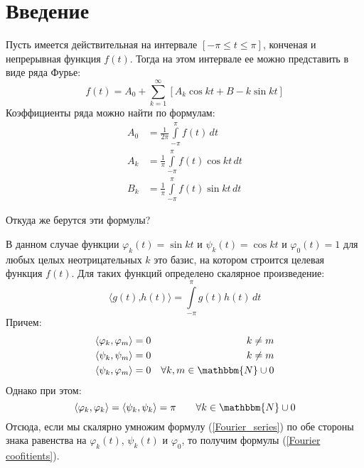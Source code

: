 \section{Введение}
Пусть имеется действительная на интервале $\left[-\pi \leqslant t \leqslant \pi \right]$, конченая и непрерывная функция $f(t)$. Тогда на этом интервале ее можно представить в виде ряда Фурье:
\begin{equation}
    f(t) = A_0 + \sum \limits_{k = 1}^{\infty}\left[A_k \cos{kt} + B-k \sin{kt} \right]
    \label{Fourier_series}
\end{equation}
Коэффициенты ряда можно найти по формулам:
\begin{align}
    A_0 & {} = \frac1{2\pi}\int \limits^{\pi}_{-\pi}f(t)\,dt \\
    A_k & {} = \frac1{\pi} \int \limits^{\pi}_{-\pi}f(t) \cos{kt}\, dt \\
    B_k & {} = \frac1{\pi} \int \limits^{\pi}_{-\pi}f(t) \sin{kt}\, dt
    \label{Fourier coofitients}
\end{align}

Откуда же берутся эти формулы?

В данном случае функции $\varphi_k(t) = \sin{kt}$ и $\psi_k(t) = \cos{kt}$ и $\varphi_0(t) = 1$ для любых целых неотрицательных $k$ это базис, на котором строится целевая функция $f(t)$. Для таких функций определено скалярное произведение:
\begin{equation}
    \langle g(t) \text{,} h(t) \rangle = \int \limits^{\pi}_{-\pi} g(t)h(t)\, dt
\end{equation}
Причем:
\begin{align*}
    \langle \varphi_k, \varphi_m \rangle & {} = 0 & k \neq m \\
    \langle \psi_k, \psi_m \rangle & {} = 0 & k \neq m\\
    \langle \psi_k, \varphi_m \rangle & {} = 0 &  \forall k, m \in\mathbbm{N} \cup 0
\end{align*}
Однако при этом:
\begin{equation}
    \langle \varphi_k, \varphi_k \rangle = \langle \psi_k, \psi_k \rangle = \pi \qquad \forall k \in\mathbbm{N} \cup 0\\
\end{equation}
Отсюда, если мы скалярно умножим формулу (\ref{Fourier_series}) по обе стороны знака равенства на $\varphi_k(t)$, $\psi_k(t)$ и $\varphi_0$, то получим формулы (\ref{Fourier coofitients}).
    
